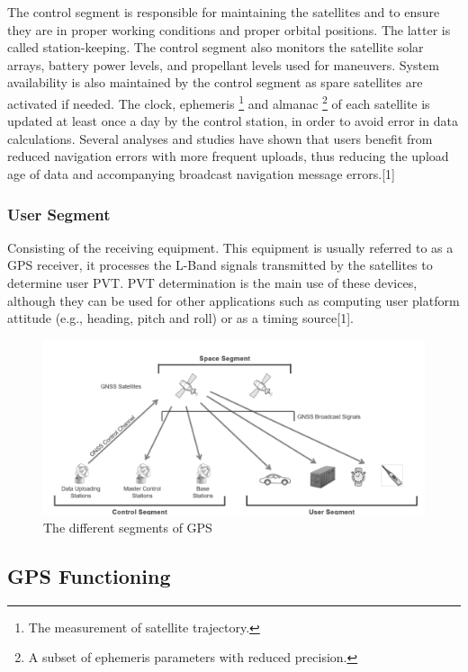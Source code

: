 \documentclass[conference]{IEEEtran}
\begin{document}
The control segment is responsible for maintaining the satellites and to ensure they are in proper working conditions and proper orbital positions. The latter is called station-keeping. The control segment also monitors the satellite solar arrays, battery power levels, and propellant levels used for maneuvers. System availability is also maintained by the control segment as spare satellites are activated if needed. The clock, ephemeris \footnote{The measurement of satellite trajectory.} and almanac \footnote{A subset of ephemeris parameters with reduced precision.} of each satellite is updated at least once a day by the control station, in order to avoid error in data calculations. Several analyses and studies have shown that users benefit from reduced navigation errors with more frequent uploads, thus reducing the upload age of data and accompanying broadcast navigation message errors.[1]

\subsubsection{\textbf{User Segment}}

Consisting of the receiving equipment. This equipment is usually referred to as a GPS receiver, it processes the L-Band signals transmitted by the satellites to determine user PVT. PVT determination is the main use of these devices, although they can be used for other applications such as computing user platform attitude (e.g., heading, pitch and roll) or as a timing source[1].

\begin{figure}
    \includegraphics[width=\columnwidth]{img4.png}
    \caption{The different segments of GPS}
\end{figure}

\subsection{GPS Functioning}
\end{document}
